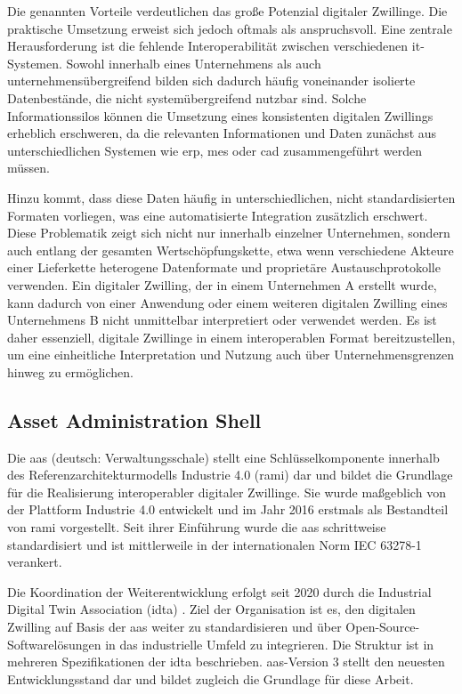 Die genannten Vorteile verdeutlichen das große Potenzial digitaler Zwillinge. 
Die praktische Umsetzung erweist sich jedoch oftmals als anspruchsvoll.
Eine zentrale Herausforderung ist die fehlende Interoperabilität zwischen verschiedenen \ac{it}-Systemen.
Sowohl innerhalb eines Unternehmens als auch unternehmensübergreifend bilden sich dadurch häufig voneinander isolierte Datenbestände, die nicht systemübergreifend nutzbar sind.
Solche Informationssilos können die Umsetzung eines konsistenten digitalen Zwillings erheblich erschweren, da die relevanten Informationen und Daten zunächst aus unterschiedlichen Systemen wie \ac{erp}, \ac{mes} oder \ac{cad} zusammengeführt werden müssen.

Hinzu kommt, dass diese Daten häufig in unterschiedlichen, nicht standardisierten Formaten vorliegen, was eine automatisierte Integration zusätzlich erschwert.
Diese Problematik zeigt sich nicht nur innerhalb einzelner Unternehmen, sondern auch entlang der gesamten Wertschöpfungskette, etwa wenn verschiedene Akteure einer Lieferkette heterogene Datenformate und proprietäre Austauschprotokolle verwenden.
Ein digitaler Zwilling, der in einem Unternehmen A erstellt wurde, kann dadurch von einer Anwendung oder einem weiteren digitalen Zwilling eines Unternehmens B nicht unmittelbar interpretiert oder verwendet werden.
Es ist daher essenziell, digitale Zwillinge in einem interope\-rablen Format bereitzustellen, um eine einheitliche Interpretation und Nutzung auch über Unternehmensgrenzen hinweg zu ermöglichen.
\cite{DTandAASConceptsInI4.0}

\newpage
\subsection{Asset Administration Shell}
\label{chap:AAS}

Die \acs{aas} (deutsch: Verwaltungsschale) stellt eine Schlüsselkomponente innerhalb des Referenzarchitekturmodells Industrie 4.0 (\acs{rami}) \cite{RAMI4.0} dar und bildet die Grundlage für die Realisierung interoperabler digitaler Zwillinge. 
Sie wurde maßgeblich von der Plattform Industrie 4.0 entwickelt und im Jahr 2016 erstmals als Bestandteil von \acs{rami} vorgestellt. 
Seit ihrer Einführung wurde die \acs{aas} schrittweise standardisiert und ist mittlerweile in der internationalen Norm IEC 63278-1 \cite{AASIEC63278} verankert.

Die Koordination der Weiterentwicklung erfolgt seit 2020 durch die Industrial Digital Twin Association (\acs{idta}) \cite{IDTA}. 
Ziel der Organisation ist es, den digitalen Zwilling auf Basis der \acs{aas} weiter zu standardisieren und über Open-Source-Softwarelösungen in das industrielle Umfeld zu integrieren. 
Die Struktur ist in mehreren Spezifikationen der \acs{idta} beschrieben.
\acs{aas}-Version 3 stellt den neuesten Entwicklungsstand dar und bildet zugleich die Grundlage für diese Arbeit.

